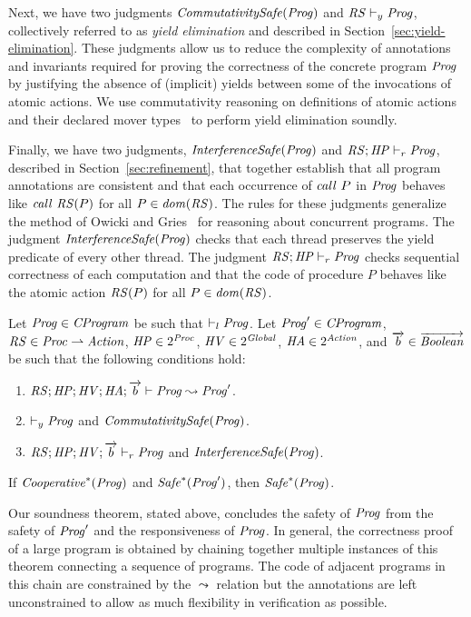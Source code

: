 Next, we have two judgments $\mathit{CommutativitySafe}(\mathit{Prog})$ and $\mathit{RS} \vdash_y \mathit{Prog}$, collectively 
referred to as {\em yield elimination\/} and described in Section~\ref{sec:yield-elimination}.
These judgments allow us to reduce the complexity of annotations and invariants 
required for proving the correctness of the concrete program $\mathit{Prog}$
by justifying the absence of (implicit) yields between some of the 
invocations of atomic actions.
We use commutativity reasoning on definitions of atomic actions and their declared mover types~\cite{FlanaganFLQ08,ElmasQT09}
to perform yield elimination soundly.

Finally, we have two judgments, $\mathit{InterferenceSafe}(\mathit{Prog})$ and $\mathit{RS};\mathit{HP} \vdash_r \mathit{Prog}$,
described in Section~\ref{sec:refinement},
that together establish that all program annotations are consistent and that 
each occurrence of $\mathit{call}\ P$ in $\mathit{Prog}$ behaves like $\mathit{call}\ \mathit{RS}(P)$ 
for all $P \in \mathit{dom}(\mathit{RS})$.
The rules for these judgments generalize the method of Owicki and Gries~\cite{OwickiG76} for reasoning about concurrent programs.
The judgment $\mathit{InterferenceSafe}(\mathit{Prog})$ checks that each thread preserves the
yield predicate of every other thread.
The judgment $\mathit{RS};\mathit{HP} \vdash_r \mathit{Prog}$ checks sequential correctness of each computation
and that the code of procedure $P$ behaves like the atomic action $\mathit{RS}(P)$ for all $P\in\mathit{dom}(\mathit{RS})$.

\begin{theorem}
\label{thm:correctness}
Let $\mathit{Prog} \in \mathit{CProgram}$ be such that $\vdash_l \mathit{Prog}$.
Let $\mathit{Prog}' \in \mathit{CProgram}$, $\mathit{RS} \in \mathit{Proc} \rightharpoonup \mathit{Action}$, $\mathit{HP} \in 2^{\mathit{Proc}}$, 
$\mathit{HV} \in 2^{\mathit{Global}}$, $\mathit{HA} \in 2^{\mathit{Action}}$,
and $\overrightarrow{b} \in \overrightarrow{\mathit{Boolean}}$ be such that the following conditions hold:
\begin{enumerate}
\item
$\mathit{RS};\mathit{HP};\mathit{HV};\mathit{HA};\overrightarrow{b} \vdash \mathit{Prog} \leadsto \mathit{Prog}'$.
\item
$\vdash_y \mathit{Prog}$ and $\mathit{CommutativitySafe}(\mathit{Prog})$.
\item
$\mathit{RS};\mathit{HP};\mathit{HV};\overrightarrow{b} \vdash_r \mathit{Prog}$ and $\mathit{InterferenceSafe}(\mathit{Prog})$.
\end{enumerate}
If $\mathit{Cooperative}^*(\mathit{Prog})$ and $\mathit{Safe}^*(\mathit{Prog}')$, then $\mathit{Safe}^*(\mathit{Prog})$.
\end{theorem}

Our soundness theorem, stated above, concludes the safety of $\mathit{Prog}$ from the safety of $\mathit{Prog}'$ 
and the responsiveness of $\mathit{Prog}$.
In general, the correctness proof of a large program is obtained by chaining together
multiple instances of this theorem connecting a sequence of programs.  
The code of adjacent programs in this chain are constrained by the $\leadsto$ relation but the annotations are left 
unconstrained to allow as much flexibility in verification as possible.

